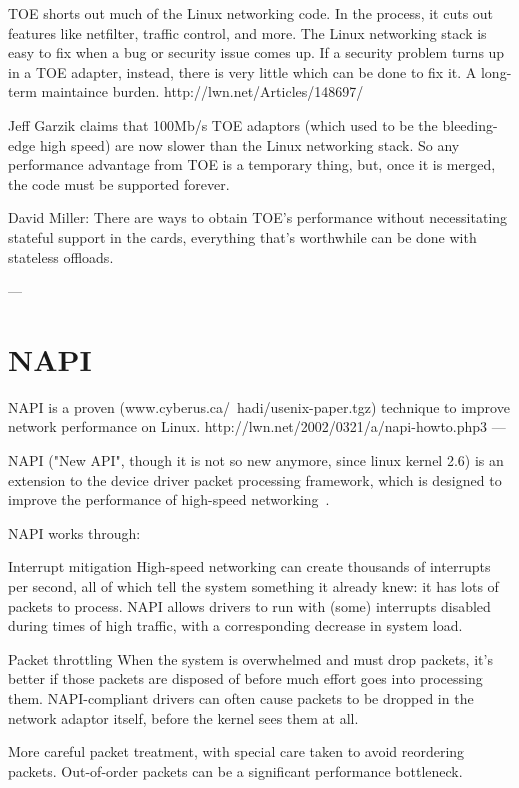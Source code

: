 TOE shorts out much of the Linux networking code.
In the process, it cuts out features like netfilter, traffic control, and more.
The Linux networking stack is easy to fix when a bug or security issue comes up. If a security problem turns up in a TOE adapter, instead, there is very little which can be done to fix it.
A long-term maintaince burden. http://lwn.net/Articles/148697/

Jeff Garzik claims that 100Mb/s TOE adaptors
(which used to be the bleeding-edge high speed)
are now slower than the Linux networking stack.
So any performance advantage from TOE is a temporary thing, but, once it is merged, the code must be supported forever.

David Miller: There are ways to obtain TOE's performance without
necessitating stateful support in the cards, everything that's
worthwhile can be done with stateless offloads.

---


\section{NAPI}

NAPI is a proven (www.cyberus.ca/~hadi/usenix-paper.tgz) technique
to improve network performance on Linux.
http://lwn.net/2002/0321/a/napi-howto.php3
---

NAPI ("New API", though it is not so new anymore, since linux kernel 2.6) is an extension to the device driver packet processing framework, which is designed to improve the performance of high-speed networking~\cite{linux-foundation-napi}.

NAPI works through:

Interrupt mitigation 
    High-speed networking can create thousands of interrupts per second, all of which tell the system something it already knew: it has lots of packets to process. NAPI allows drivers to run with (some) interrupts disabled during times of high traffic, with a corresponding decrease in system load.

Packet throttling 
    When the system is overwhelmed and must drop packets, it's better if those packets are disposed of before much effort goes into processing them. NAPI-compliant drivers can often cause packets to be dropped in the network adaptor itself, before the kernel sees them at all.

More careful packet treatment, with special care taken to avoid reordering packets. Out-of-order packets can be a significant performance bottleneck. 


